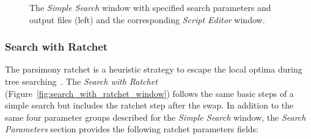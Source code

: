 \begin{figure}
\begin{minipage}[c]{0.48\textwidth}
   	\end{minipage}
	
    \caption{The \emph{Simple Search} window with specified search parameters and output files (left) and the corresponding \emph{Script Editor} window.}
    \label{fig:ScriptEditor_Window}
\end{figure}

\subsubsection{Search with Ratchet}

The parsimony ratchet is a heuristic strategy to escape the local optima during tree searching~\cite{Nixon1999}. The \emph{Search with Ratchet} (Figure~\ref{fig:search_with_ratchet_window}) follows the same basic steps of a simple search but includes the ratchet step after the swap. In addition to the same four parameter groups described for the \emph{Simple Search} window, the \emph{Search Parameters} section provides the following ratchet parameters fields:

